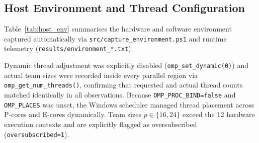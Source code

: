 \documentclass[11pt,a4paper]{article}
\begin{document}
\subsection{Host Environment and Thread Configuration}
Table~\ref{tab:host_env} summarises the hardware and software environment captured automatically via \texttt{src/capture\_environment.ps1} and runtime telemetry (\texttt{results/environment\_*.txt}).

\begin{table}[htbp]
\centering
\caption{Recorded hardware, compiler, OpenMP runtime, and analysis environment.}
\label{tab:host_env}
\small
{}
\end{table}

Dynamic thread adjustment was explicitly disabled (\texttt{omp\_set\_dynamic(0)}) and actual team sizes were recorded inside every parallel region via \texttt{omp\_get\_num\_threads()}, confirming that requested and actual thread counts matched identically in all observations. Because \texttt{OMP\_PROC\_BIND=false} and \texttt{OMP\_PLACES} was unset, the Windows scheduler managed thread placement across P-cores and E-cores dynamically. Team sizes $p \in \{16, 24\}$ exceed the 12 hardware execution contexts and are explicitly flagged as oversubscribed (\texttt{oversubscribed=1}).
\end{document}
